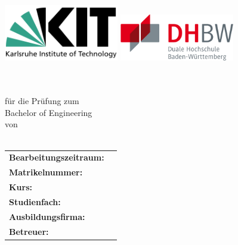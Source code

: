 \begin{titlepage}


	\setlength{\hoffset}{ (\RechterRand-\LinkerRand)/2 }								%
	
	\begin{centering}
	
    \includegraphics[width=5cm]{Bilder/Titelseite/KIT-Logo}						%
		\hfill																														%
    \includegraphics[width=5cm]{Bilder/Titelseite/DHBW-Logo}					%
		\vspace{2.5cm}																										%
		
		
		\textbf{\LARGE{\Titel}}		\vspace{.7cm}\\
		\Berichttyp \vspace{.7cm}\\
		für die Prüfung zum\\
		Bachelor of Engineering\vspace{1cm}\\
		von\\
		\Autor\vspace{.2cm}\\
		\Datum
		
		\vfill
		
		\begin{tabular}{ll}
			\textbf{ Bearbeitungszeitraum:	}	&	\Bearbeitungszeitraum					\vspace{0.2cm}			\\
			\textbf{ Matrikelnummer:		}	&	\Matrikelnummer							\vspace{0.2cm}			\\
			\textbf{ Kurs:					}	&	\Kurs									\vspace{0.2cm}			\\
			\textbf{ Studienfach:			}	&	\Studienfach									\vspace{0.2cm}			\\
			\textbf{ Ausbildungsfirma:		}	&	\Ausbildungsfirma						\vspace{0.2cm}			\\
			\textbf{ Betreuer: 				}	&	\Betreuer								\vspace{0.2cm}			\\
		\end{tabular}
	\end{centering}
\end{titlepage}

